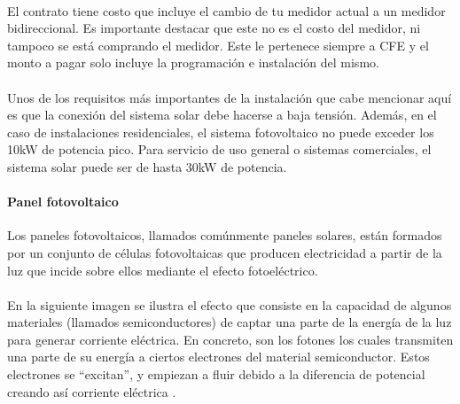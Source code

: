 \paragraph{}
El contrato tiene costo que incluye el cambio de tu medidor actual a un medidor bidireccional. Es importante destacar que este no es el costo del medidor, ni tampoco se está comprando el medidor. Este le pertenece siempre a CFE y el monto a pagar solo incluye la programación e instalación del mismo.
\paragraph{}
Unos de los requisitos más importantes de la instalación que cabe mencionar aquí es que la conexión del sistema solar debe hacerse a baja tensión. Además, en el caso de instalaciones residenciales, el sistema fotovoltaico no puede exceder los 10kW de potencia pico. Para servicio de uso general o sistemas comerciales, el sistema solar puede ser de hasta 30kW de potencia.
\paragraph{}

\paragraph{Panel fotovoltaico}
Los paneles fotovoltaicos, llamados comúnmente paneles solares, están formados por un conjunto de células fotovoltaicas que producen electricidad a partir de la luz que incide sobre ellos mediante el efecto fotoeléctrico.
\paragraph{}
En la siguiente imagen se ilustra el efecto que consiste en la capacidad de algunos materiales (llamados semiconductores) de captar una parte de la energía de la luz para generar corriente eléctrica. En concreto, son los fotones los cuales transmiten una parte de su energía a ciertos electrones del material semiconductor. Estos electrones se “excitan”, y empiezan a fluir debido a la diferencia de potencial creando así corriente eléctrica \citep{MarcoTeorico2}.

